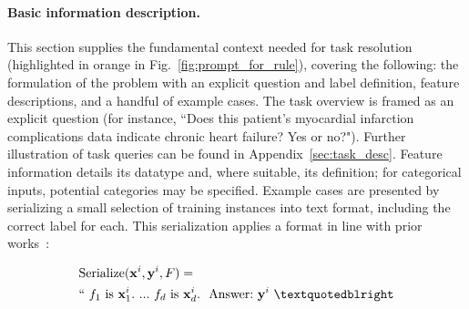 \vspace*{-0.12in}
\paragraph{Basic information description.} This section supplies the fundamental context needed for task resolution (highlighted in orange in Fig.~\ref{fig:prompt_for_rule}), covering the following: the formulation of the problem with an explicit question and label definition, feature descriptions, and a handful of example cases. The task overview is framed as an explicit question (for instance, ``Does this patient's myocardial infarction complications data indicate chronic heart failure? Yes or no?"). Further illustration of task queries can be found in Appendix~\ref{sec:task_desc}. Feature information details its datatype and, where suitable, its definition; for categorical inputs, potential categories may be specified. Example cases are presented by serializing a small selection of training instances into text format, including the correct label for each. This serialization applies a format in line with prior works~\cite{dinh2022lift,hegselmann2023tabllm}:

\begin{align}
&\text{Serialize}(\mathbf{x}^i,\mathbf{y}^i, F) = \nonumber \\ 
&``\ f_1\ \text{is}\ \mathbf{x}^i_1.\ ... \ f_d\  \text{is}\  \mathbf{x}^i_d.\ \ \text{Answer:}\  \mathbf{y}^i\ ”
\end{align}

\vspace*{-0.12in}
